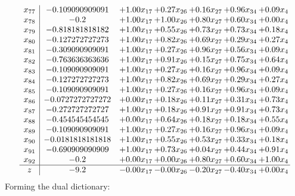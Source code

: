 \documentclass[8pt]{article}
\begin{document}
\[\begin{array}{c| c c@{\hskip 2pt} c@{\hskip 2pt} c@{\hskip 2pt} c@{\hskip 2pt} c@{\hskip 2pt} }
 x_{77}   &  -0.109090909091 & +  1.00 x_{17} & +  0.27 x_{26} & +  0.16 x_{27} & +  0.96 x_{34} & +  0.09 x_{4}\\
 x_{78}   &  -0.2 & +  1.00 x_{17} & +  1.00 x_{26} & +  0.80 x_{27} & +  0.60 x_{34} & +  0.00 x_{4}\\
 x_{79}   &  -0.818181818182 & +  1.00 x_{17} & +  0.55 x_{26} & +  0.73 x_{27} & +  0.73 x_{34} & +  0.18 x_{4}\\
 x_{80}   &  -0.127272727273 & +  1.00 x_{17} & +  0.82 x_{26} & +  0.69 x_{27} & +  0.29 x_{34} & +  0.27 x_{4}\\
 x_{81}   &  -0.309090909091 & +  1.00 x_{17} & +  0.27 x_{26} & +  0.96 x_{27} & +  0.56 x_{34} & +  0.09 x_{4}\\
 x_{82}   &  -0.763636363636 & +  1.00 x_{17} & +  0.91 x_{26} & +  0.15 x_{27} & +  0.75 x_{34} & +  0.64 x_{4}\\
 x_{83}   &  -0.109090909091 & +  1.00 x_{17} & +  0.27 x_{26} & +  0.16 x_{27} & +  0.96 x_{34} & +  0.09 x_{4}\\
 x_{84}   &  -0.127272727273 & +  1.00 x_{17} & +  0.82 x_{26} & +  0.69 x_{27} & +  0.29 x_{34} & +  0.27 x_{4}\\
 x_{85}   &  -0.109090909091 & +  1.00 x_{17} & +  0.27 x_{26} & +  0.16 x_{27} & +  0.96 x_{34} & +  0.09 x_{4}\\
 x_{86}   &  -0.0727272727272 & +  0.00 x_{17} & +  0.18 x_{26} & +  0.11 x_{27} & +  0.31 x_{34} & +  0.73 x_{4}\\
 x_{87}   &  -0.272727272727 & +  1.00 x_{17} & +  0.18 x_{26} & +  0.91 x_{27} & +  0.91 x_{34} & +  0.73 x_{4}\\
 x_{88}   &  -0.454545454545 & +  0.00 x_{17} & +  0.64 x_{26} & +  0.18 x_{27} & +  0.18 x_{34} & +  0.55 x_{4}\\
 x_{89}   &  -0.109090909091 & +  1.00 x_{17} & +  0.27 x_{26} & +  0.16 x_{27} & +  0.96 x_{34} & +  0.09 x_{4}\\
 x_{90}   &  -0.0181818181818 & +  1.00 x_{17} & +  0.55 x_{26} & +  0.53 x_{27} & +  0.33 x_{34} & +  0.18 x_{4}\\
 x_{91}   &  -0.690909090909 & +  1.00 x_{17} & +  0.73 x_{26} & +  0.04 x_{27} & +  0.44 x_{34} & +  0.91 x_{4}\\
 x_{92}   &  -0.2 & +  0.00 x_{17} & +  0.00 x_{26} & +  0.80 x_{27} & +  0.60 x_{34} & +  1.00 x_{4}\\
\hline
z    &  -9.2 & -0.00 x_{17} & -0.00 x_{26} & -0.20 x_{27} & -0.40 x_{34} & +  0.00 x_{4}\\
\end{array}\]
Forming the dual dictionary:
\end{document}
